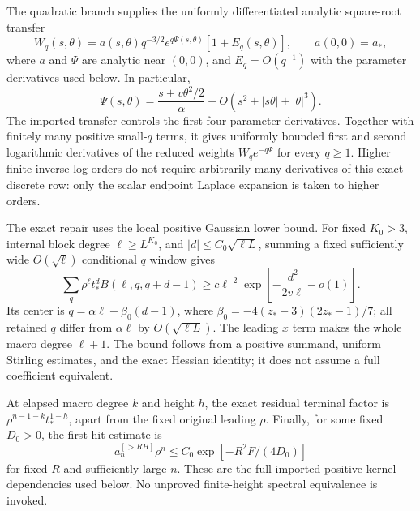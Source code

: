 \documentclass[11pt,letterpaper]{article}
\numberwithin{equation}{section}
\theoremstyle{remark}\newtheorem{remark}[theorem]{Remark}
\begin{document}
The quadratic branch supplies the uniformly differentiated analytic
square-root transfer
\begin{equation}\label{a61:ao:eq:transfer}
 W_q(s,\theta)=a(s,\theta)q^{-3/2}e^{q\Psi(s,\theta)}
 [1+E_q(s,\theta)],\qquad a(0,0)=a_*,
\end{equation}
where $a$ and $\Psi$ are analytic near $(0,0)$, and $E_q=O(q^{-1})$
with the parameter derivatives used below. In particular,
\begin{equation}\label{a61:ao:eq:Psi}
 \Psi(s,\theta)=\frac{s+v\theta^2/2}{\alpha}
 +O(s^2+|s\theta|+|\theta|^3).
\end{equation}
The imported transfer controls the first four parameter derivatives.
Together with finitely many positive small-$q$ terms, it gives uniformly
bounded first and second logarithmic derivatives of the reduced weights
$W_qe^{-q\Psi}$ for every $q\ge1$. Higher finite inverse-log orders do
not require arbitrarily many derivatives of this exact discrete row:
only the scalar endpoint Laplace expansion is taken to higher orders.

The exact repair uses the local positive Gaussian lower bound. For
fixed $K_0>3$, internal block degree $\ell\ge L^{K_0}$, and
$|d|\le C_0\sqrt{\ell L}$, summing a fixed sufficiently wide
$O(\sqrt\ell)$ conditional $q$ window gives
\begin{equation}\label{a61:ao:eq:patch}
 \sum_q\rho^\ell t_*^d B(\ell,q,q+d-1)
 \ge c\ell^{-2}\exp\left[-\frac{d^2}{2v\ell}-o(1)\right].
\end{equation}
Its center is $q=\alpha\ell+\beta_0(d-1)$, where
$\beta_0=-4(z_*-3)(2z_*-1)/7$; all retained $q$ differ from
$\alpha\ell$ by $O(\sqrt{\ell L})$. The leading $x$ term makes the
whole macro degree $\ell+1$. The bound follows from a positive
summand, uniform Stirling estimates, and the exact Hessian identity;
it does not assume a full coefficient equivalent.

At elapsed macro degree $k$ and height $h$, the exact residual terminal
factor is $\rho^{n-1-k}t_*^{1-h}$, apart from the fixed original leading
$\rho$. Finally, for some fixed $D_0>0$, the first-hit estimate is
\begin{equation}\label{a61:ao:eq:firsthit}
 a_n^{[>RH]}\rho^n\le C_0\exp[-R^2F/(4D_0)]
\end{equation}
for fixed $R$ and sufficiently large $n$. These are the full imported
positive-kernel dependencies used below. No unproved finite-height
spectral equivalence is invoked.
\end{document}
